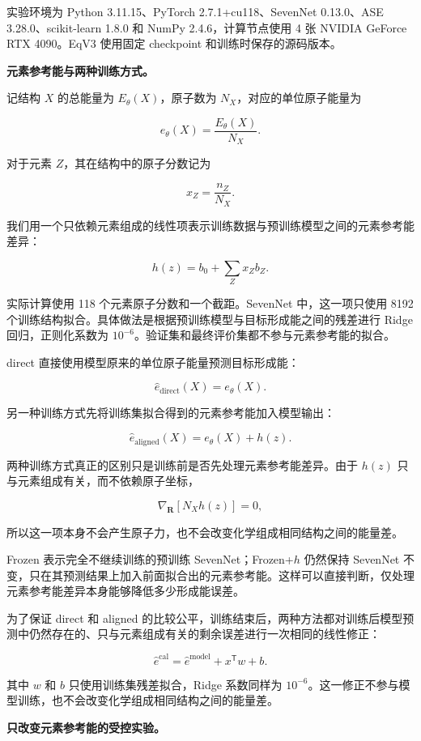 \documentclass[UTF8,a4paper,12pt,fontset=fandol]{ctexart}
\begin{document}
实验环境为 Python 3.11.15、PyTorch 2.7.1+cu118、SevenNet 0.13.0、ASE 3.28.0、scikit-learn 1.8.0 和 NumPy 2.4.6，计算节点使用 4 张 NVIDIA GeForce RTX 4090。EqV3 使用固定 checkpoint 和训练时保存的源码版本。


\textbf{元素参考能与两种训练方式。}

记结构 \(X\) 的总能量为 \(E_\theta(X)\)，原子数为 \(N_X\)，对应的单位原子能量为

\[
e_\theta(X)=\frac{E_\theta(X)}{N_X}.
\]

对于元素 \(Z\)，其在结构中的原子分数记为

\[
x_Z=\frac{n_Z}{N_X}.
\]

我们用一个只依赖元素组成的线性项表示训练数据与预训练模型之间的元素参考能差异：

\[
h(z)=b_0+\sum_Z x_Zb_Z.
\]

实际计算使用 118 个元素原子分数和一个截距。SevenNet 中，这一项只使用 8192 个训练结构拟合。具体做法是根据预训练模型与目标形成能之间的残差进行 Ridge 回归，正则化系数为 \(10^{-6}\)。验证集和最终评价集都不参与元素参考能的拟合。

direct 直接使用模型原来的单位原子能量预测目标形成能：

\[
\hat e_{\mathrm{direct}}(X)
=
e_\theta(X).
\]

另一种训练方式先将训练集拟合得到的元素参考能加入模型输出：

\[
\hat e_{\mathrm{aligned}}(X)
=
e_\theta(X)+h(z).
\]

两种训练方式真正的区别只是训练前是否先处理元素参考能差异。由于 \(h(z)\) 只与元素组成有关，而不依赖原子坐标，

\[
\nabla_{\mathbf R}[N_Xh(z)]=0,
\]

所以这一项本身不会产生原子力，也不会改变化学组成相同结构之间的能量差。

Frozen 表示完全不继续训练的预训练 SevenNet；Frozen+$h$ 仍然保持 SevenNet 不变，只在其预测结果上加入前面拟合出的元素参考能。这样可以直接判断，仅处理元素参考能差异本身能够降低多少形成能误差。

为了保证 direct 和 aligned 的比较公平，训练结束后，两种方法都对训练后模型预测中仍然存在的、只与元素组成有关的剩余误差进行一次相同的线性修正：

\[
\hat e^{\mathrm{cal}}
=
\hat e^{\mathrm{model}}
+
x^{\mathsf T}w+b.
\]

其中 \(w\) 和 \(b\) 只使用训练集残差拟合，Ridge 系数同样为 \(10^{-6}\)。这一修正不参与模型训练，也不会改变化学组成相同结构之间的能量差。


\textbf{只改变元素参考能的受控实验。}
\end{document}
